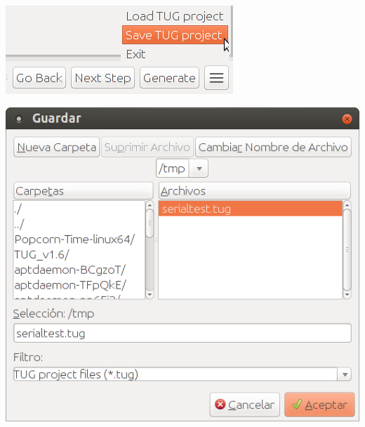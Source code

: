 \begin{enumerate}
\vspace{1ex}
\includegraphics[width=.5\textwidth]{images/tug_save.png}

\vspace{1ex}
\includegraphics[width=.7\textwidth]{images/tug_save2.png}
\vspace{3ex}



\end{enumerate}
\newpage





